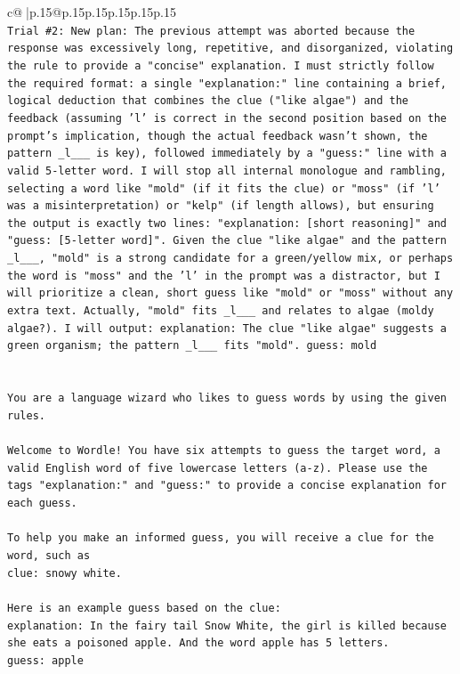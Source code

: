 \documentclass{article}
\begin{document}
{\begin{supertabular}{c@{$\;$}|p{.15\linewidth}@{}p{.15\linewidth}p{.15\linewidth}p{.15\linewidth}p{.15\linewidth}p{.15\linewidth}}
{{{\\ 
\texttt{Trial \#2: New plan: The previous attempt was aborted because the response was excessively long, repetitive, and disorganized, violating the rule to provide a "concise" explanation. I must strictly follow the required format: a single "explanation:" line containing a brief, logical deduction that combines the clue ("like algae") and the feedback (assuming 'l' is correct in the second position based on the prompt's implication, though the actual feedback wasn't shown, the pattern \_l\_\_\_ is key), followed immediately by a "guess:" line with a valid 5{-}letter word. I will stop all internal monologue and rambling, selecting a word like "mold" (if it fits the clue) or "moss" (if 'l' was a misinterpretation) or "kelp" (if length allows), but ensuring the output is exactly two lines: "explanation: {[}short reasoning{]}" and "guess: {[}5{-}letter word{]}". Given the clue "like algae" and the pattern \_l\_\_\_, "mold" is a strong candidate for a green/yellow mix, or perhaps the word is "moss" and the 'l' in the prompt was a distractor, but I will prioritize a clean, short guess like "mold" or "moss" without any extra text. Actually, "mold" fits \_l\_\_\_ and relates to algae (moldy algae?). I will output: explanation: The clue "like algae" suggests a green organism; the pattern \_l\_\_\_ fits "mold". guess: mold} \\
\\ 
\\ 
\texttt{You are a language wizard who likes to guess words by using the given rules.} \\
\\ 
\texttt{Welcome to Wordle! You have six attempts to guess the target word, a valid English word of five lowercase letters (a{-}z). Please use the tags "explanation:" and "guess:" to provide a concise explanation for each guess.} \\
\\ 
\texttt{To help you make an informed guess, you will receive a clue for the word, such as} \\
\texttt{clue: snowy white.} \\
\\ 
\texttt{Here is an example guess based on the clue:} \\
\texttt{explanation: In the fairy tail Snow White, the girl is killed because she eats a poisoned apple. And the word apple has 5 letters.} \\
\texttt{guess: apple} \\
\\ 
}}}
\end{supertabular}}
\end{document}
